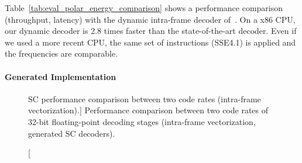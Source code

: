Table~\ref{tab:eval_polar_energy_comparison} shows a performance comparison
(throughput, latency) with the dynamic intra-frame decoder of~\cite{Giard2014}.
On a x86 CPU, our dynamic decoder is 2.8 times faster than the state-of-the-art
decoder. Even if we used a more recent CPU, the same set of instructions
(SSE4.1) is applied and the frequencies are comparable.

\paragraph{Generated Implementation}

\begin{figure}[htp]
  \centering
  \quad
  \caption
    [SC performance comparison between two code rates (intra-frame
     vectorization).]
    {Performance comparison between two code rates of 32-bit floating-point
    decoding stages (intra-frame vectorization, generated SC decoders).}
  \label{plot:eval_polar_sc_gen_thr_intra}
\end{figure}

